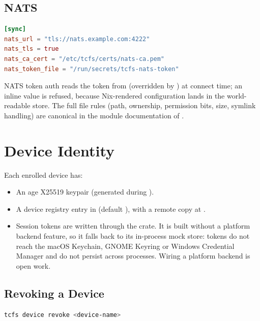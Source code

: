 \documentclass[11pt,a4paper]{article}
\begin{document}
\subsection{NATS}

\begin{lstlisting}[language=toml]
[sync]
nats_url = "tls://nats.example.com:4222"
nats_tls = true
nats_ca_cert = "/etc/tcfs/certs/nats-ca.pem"
nats_token_file = "/run/secrets/tcfs-nats-token"
\end{lstlisting}

NATS token auth reads the token from  (overridden by
) at connect time; an inline 
value is refused, because Nix-rendered configuration lands in the
world-readable store. The full file rules (path, ownership, permission bits,
size, symlink handling) are canonical in the module documentation of
.

\section{Device Identity}

Each enrolled device has:

\begin{itemize}
  \item An age X25519 keypair (generated during ).
  \item A device registry entry in
         (default
        ), with a remote
        copy at .
  \item Session tokens are written through the  crate. It is
        built without a platform backend feature, so it falls back to its
        in-process mock store: tokens do not reach the macOS Keychain, GNOME
        Keyring or Windows Credential Manager and do not persist across
        processes. Wiring a platform backend is open work.
\end{itemize}

\subsection{Revoking a Device}

\begin{lstlisting}[language=bash]
tcfs device revoke <device-name>
\end{lstlisting}
\end{document}
